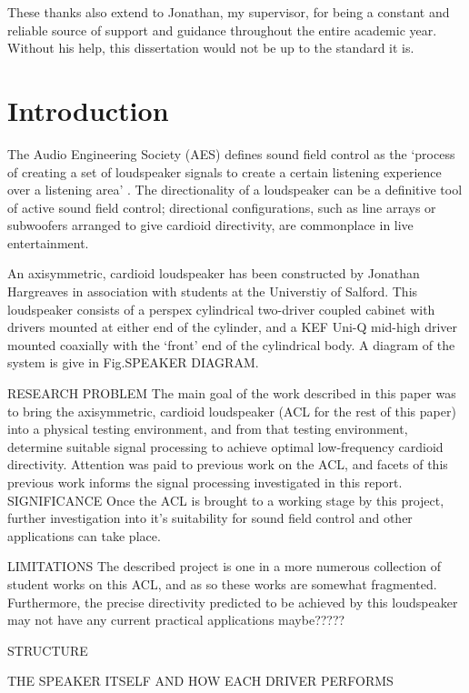 \documentclass{report}
\begin{document}
    These thanks also extend to Jonathan, my supervisor, for being a constant and reliable source of support and guidance throughout the entire academic year.
    Without his help, this dissertation would not be up to the standard it is.
\tableofcontents
\listoffigures
\newpage

\chapter{Introduction}
    The Audio Engineering Society (AES) defines sound field control as the `process of creating a set of loudspeaker signals to create a certain listening experience over a listening area' \cite{AESsoundfieldcontrol}.
    The directionality of a loudspeaker can be a definitive tool of active sound field control; directional configurations, such as line arrays or subwoofers arranged to give cardioid directivity, are commonplace in live entertainment.

    An axisymmetric, cardioid loudspeaker has been constructed by Jonathan Hargreaves in association with students at the Universtiy of Salford.
    This loudspeaker consists of a perspex cylindrical two-driver coupled cabinet with drivers mounted at either end of the cylinder, and a KEF Uni-Q mid-high driver mounted coaxially with the `front' end of the cylindrical body.
    A diagram of the system is give in Fig.SPEAKER DIAGRAM.

    RESEARCH PROBLEM
    The main goal of the work described in this paper was to bring the axisymmetric, cardioid loudspeaker (ACL for the rest of this paper) into a physical testing environment, and from that testing environment, determine suitable signal processing to achieve optimal low-frequency cardioid directivity.
    Attention was paid to previous work on the ACL, and facets of this previous work informs the signal processing investigated in this report.
    SIGNIFICANCE
    Once the ACL is brought to a working stage by this project, further investigation into it's suitability for sound field control and other applications can take place.

    LIMITATIONS
    The described project is one in a more numerous collection of student works on this ACL, and as so these works are somewhat fragmented.
    Furthermore, the precise directivity predicted to be achieved by this loudspeaker may not have any current practical applications maybe?????

    STRUCTURE

    THE SPEAKER ITSELF AND HOW EACH DRIVER PERFORMS
\end{document}
